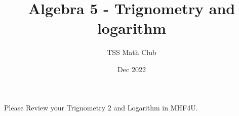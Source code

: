 \documentclass{article}
\title{Algebra 5 - Trignometry and logarithm }
\author{TSS Math Club}
\date{Dec 2022}
\begin{document}
\large

\maketitle

\center

Please Review your Trignometry 2 and Logarithm in MHF4U.
\end{document}
